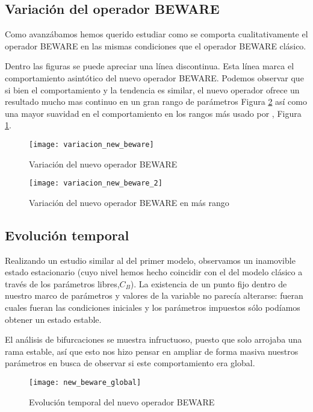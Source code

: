 \subsection{Variación del operador BEWARE}
Como avanzábamos hemos querido estudiar como se comporta cualitativamente el operador BEWARE en las mismas condiciones que el operador BEWARE clásico.

Dentro las figuras se puede apreciar una línea discontinua. Esta línea marca el comportamiento asintótico del nuevo operador BEWARE.
 Podemos observar que si bien el comportamiento y la tendencia es similar, el nuevo operador ofrece un resultado mucho mas continuo en un gran rango de parámetros Figura \ref{vari_beware_2} así como una mayor suavidad en el comportamiento en los rangos más usado por \cite{schaffer}, Figura \ref{vari_beware}. 
\begin{figure}[h]
	\texttt{[image: variacion\_new\_beware]}
	\centering
	\caption{Variación del nuevo operador BEWARE }
	\label{vari_beware}
\end{figure}

\begin{figure}[h]
	\texttt{[image: variacion\_new\_beware\_2]}
	\centering
	\caption{Variación del nuevo operador BEWARE en más rango}
	\label{vari_beware_2}
\end{figure}

\subsection{Evolución temporal}

Realizando un estudio similar al del primer modelo, observamos un inamovible estado estacionario (cuyo nivel hemos hecho coincidir con el del modelo clásico a través de los parámetros libres,$C_B$). La existencia de un punto fijo dentro de nuestro marco de parámetros y valores de la variable no parecía alterarse: fueran cuales fueran las condiciones iniciales y los parámetros impuestos sólo podíamos obtener un estado estable. 

El análisis de bifurcaciones se muestra infructuoso, puesto que solo arrojaba una rama estable, así que esto nos hizo pensar en ampliar de forma masiva nuestros parámetros en busca de observar si este comportamiento era global.


\begin{figure}[h]
	\texttt{[image: new\_beware\_global]}
	\centering
	\caption{Evolución temporal del nuevo operador BEWARE}
	\label{evolu_beware}
\end{figure}


